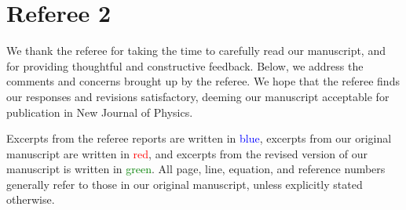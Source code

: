 \documentclass[preprint]{revtex4-1}
\newcommand{\1}{\mathds{1}}
\newcommand{\blue}[1]{\textcolor{blue}{#1}}
\newcommand{\red}[1]{\textcolor{red}{#1}}
\newcommand{\green}[1]{\textcolor{green}{#1}}
\begin{document}
\section*{Referee 2}

We thank the referee for taking the time to carefully read our
manuscript, and for providing thoughtful and constructive feedback.
Below, we address the comments and concerns brought up by the referee.
We hope that the referee finds our responses and revisions
satisfactory, deeming our manuscript acceptable for publication in New
Journal of Physics.

Excerpts from the referee reports are written in \blue{blue}, excerpts
from our original manuscript are written in \red{red}, and excerpts
from the revised version of our manuscript is written in
\green{green}.  All page, line, equation, and reference numbers
generally refer to those in our original manuscript, unless explicitly
stated otherwise.
\end{document}
